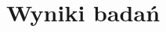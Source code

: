 \documentclass[../thesis.tex]{subfiles}
\begin{document}
\pagestyle{plain}
\chapter{Wyniki badań}
\end{document}
